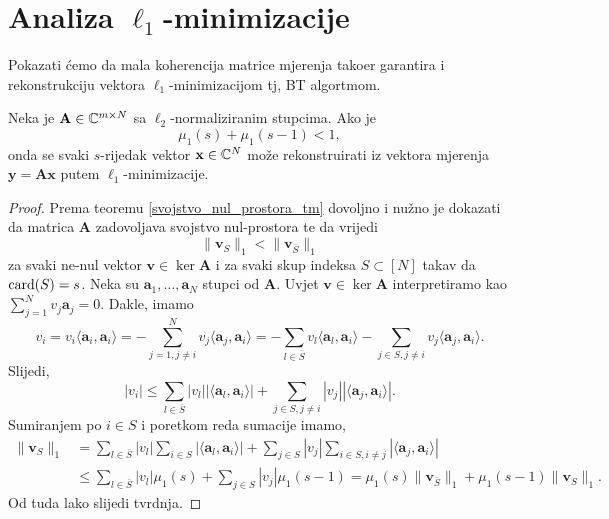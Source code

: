 \documentclass[a4paper,twoside,12pt]{memoir} %
\newcommand{\vect}[1]{\mathbf{#1}}
\renewcommand{\vec}{\vect}
\newcommand{\card}{\text{\normalfont{card}}}
\newcommand{\norm}[1]{\|{#1}\|}
\begin{document}
\section[Analiza $\ell_1$-minimizacije][Analiza $\ell_1$-minimizacije]{Analiza $\ell_1$-minimizacije}
Pokazati \'cemo da mala koherencija matrice mjerenja tako\dj er garantira i rekonstrukciju vektora $\ell_1$-minimizacijom tj, BT algortmom.
\begin{thm}\label{tm:5:15}
    Neka je $\vec A \in \C^{m \times N}$ sa $\ell_2$-normaliziranim stupcima. Ako je 
    \begin{equation}\label{5:13}
        \mu_1(s) + \mu_1(s-1) < 1, 
    \end{equation}
    onda se svaki $s$-rijedak vektor $\vec x \in \C^N$ mo\v{z}e rekonstruirati iz vektora mjerenja $\vec y = \vec{Ax}$ putem $\ell_1$-minimizacije.
\end{thm}
\begin{proof}
    Prema teoremu \ref{svojstvo_nul_prostora_tm} dovoljno i nu\v{z}no je dokazati da matrica $\vec A$ zadovoljava svojstvo nul-prostora te da vrijedi
    \begin{equation}\label{5:14}
        \norm{\vec v_S}_1 < \norm{\vec v_{\bar S}}_1 
    \end{equation}
    za svaki ne-nul vektor $\vec v \in \ker \vec A$ i za svaki skup indeksa $S \subset [N]$ takav da $\card(S) = s$. Neka su $\vec a_1, \dots, \vec a_N$ stupci od $\vec A$. Uvjet $\vec v \in \ker \vec A$ interpretiramo kao $\sum_{j=1}^N v_j \vec a_j = 0$. Dakle, imamo
    \begin{equation*}
        v_i = v_i \langle \vec a_i, \vec a_i \rangle = - \sum_{j=1,j \neq i}^N v_j \langle \vec a_j, \vec a_i \rangle = - \sum_{l \in \bar S}v_l \langle \vec a_l, \vec a_i \rangle - \sum_{j \in S,j \neq i} v_j \langle \vec a_j, \vec a_i \rangle.
    \end{equation*}
    Slijedi,
    \begin{equation*}
        |v_i| \leq \sum_{l \in \bar S}|v_l||\langle \vec a_l, \vec a_i\rangle| + \sum_{j \in S, j \neq i} |v_j||\langle \vec a_j, \vec a_i \rangle|.
    \end{equation*}
    Sumiranjem po $i \in S$ i poretkom reda sumacije imamo,
    \begin{align*}
        \norm{\vec v_S}_1 &= \sum_{l \in \bar S}|v_l|\sum_{i \in S} |\langle \vec a_l, \vec a_i \rangle| + \sum_{j \in S}|v_j| \sum_{i \in S,i \neq j}|\langle \vec a_j, \vec a_i \rangle| \\
        &\leq \sum_{l \in \bar S} |v_l| \mu_1(s) + \sum_{j \in S}|v_j| \mu_1(s-1) = \mu_1(s) \norm{\vec v_{\bar S}}_1 + \mu_1(s-1) \norm{\vec v_S}_1.
    \end{align*}
    Od tuda lako slijedi tvrdnja.
\end{proof}
\end{document}
